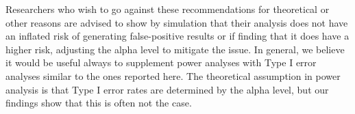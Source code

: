Researchers who wish to go against these recommendations for theoretical or other reasons are advised to show by simulation that their analysis does not have an inflated risk of generating false-positive results or if finding that it does have a higher risk, adjusting the alpha level to mitigate the issue. In general, we believe it would be useful always to supplement power analyses with Type I error analyses similar to the ones reported here. The theoretical assumption in power analysis is that Type I error rates are determined by the alpha level, but our findings show that this is often not the case.




 
